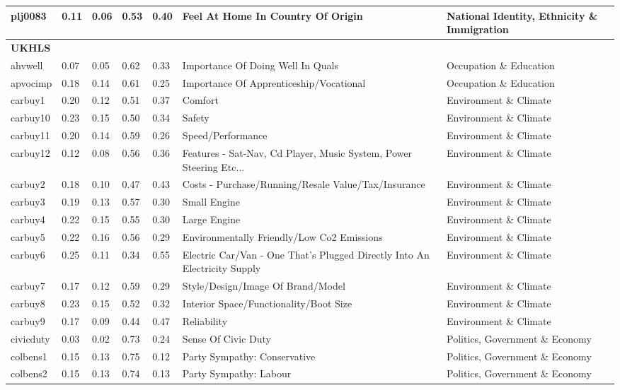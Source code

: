 \documentclass[
  12pt,
]{article}
\begin{document}
\begin{landscape}
\begin{scriptsize}
\begin{longtable}{|p{1.75in}|p{0.3in}|p{0.3in}|p{0.3in}|p{0.3in}|p{2.5in}|p{2.5in}}
plj0083 & 0.11 & 0.06 & 0.53 & 0.40 & Feel At Home In Country Of Origin & National Identity, Ethnicity \& Immigration \\ 
\midrule
\multicolumn{7}{l}{\textbf{UKHLS}} \\ 
\midrule
ahvwell & 0.07 & 0.05 & 0.62 & 0.33 & Importance Of Doing Well In Quals & Occupation \& Education \\ 
apvocimp & 0.18 & 0.14 & 0.61 & 0.25 & Importance Of Apprenticeship/Vocational & Occupation \& Education \\ 
carbuy1 & 0.20 & 0.12 & 0.51 & 0.37 & Comfort & Environment \& Climate \\ 
carbuy10 & 0.23 & 0.15 & 0.50 & 0.34 & Safety & Environment \& Climate \\ 
carbuy11 & 0.20 & 0.14 & 0.59 & 0.26 & Speed/Performance & Environment \& Climate \\ 
carbuy12 & 0.12 & 0.08 & 0.56 & 0.36 & Features - Sat-Nav, Cd Player, Music System, Power Steering Etc... & Environment \& Climate \\ 
carbuy2 & 0.18 & 0.10 & 0.47 & 0.43 & Costs - Purchase/Running/Resale Value/Tax/Insurance & Environment \& Climate \\ 
carbuy3 & 0.19 & 0.13 & 0.57 & 0.30 & Small Engine & Environment \& Climate \\ 
carbuy4 & 0.22 & 0.15 & 0.55 & 0.30 & Large Engine & Environment \& Climate \\ 
carbuy5 & 0.22 & 0.16 & 0.56 & 0.29 & Environmentally Friendly/Low Co2 Emissions & Environment \& Climate \\ 
carbuy6 & 0.25 & 0.11 & 0.34 & 0.55 & Electric Car/Van - One That's Plugged Directly Into An Electricity Supply & Environment \& Climate \\ 
carbuy7 & 0.17 & 0.12 & 0.59 & 0.29 & Style/Design/Image Of Brand/Model & Environment \& Climate \\ 
carbuy8 & 0.23 & 0.15 & 0.52 & 0.32 & Interior Space/Functionality/Boot Size & Environment \& Climate \\ 
carbuy9 & 0.17 & 0.09 & 0.44 & 0.47 & Reliability & Environment \& Climate \\ 
civicduty & 0.03 & 0.02 & 0.73 & 0.24 & Sense Of Civic Duty & Politics, Government \& Economy \\ 
colbens1 & 0.15 & 0.13 & 0.75 & 0.12 & Party Sympathy: Conservative & Politics, Government \& Economy \\ 
colbens2 & 0.15 & 0.13 & 0.74 & 0.13 & Party Sympathy: Labour & Politics, Government \& Economy \\ 

\end{longtable}
\end{scriptsize}
\end{landscape}
\end{document}
